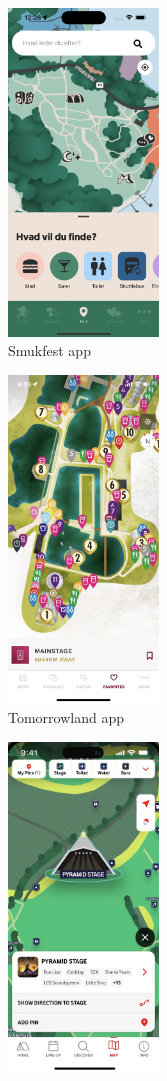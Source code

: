 \begin{figure}[H]
  \centering
  \begin{subfigure}{.3\textwidth}
    \centering
    \includegraphics[width=4cm]{Pictures/Misc/smukfest_app.png}
    \caption{Smukfest app \cite{smukfest_app}}
    \label{fig:smukfest_app}
  \end{subfigure}%
  \begin{subfigure}{.3\textwidth}
    \centering
    \includegraphics[width=4cm]{Pictures/Misc/tomorrowland_app.png}
    \caption{Tomorrowland app \cite{tomorrowland_app}}
    \label{fig:tomorrowland_app}
  \end{subfigure}
  \begin{subfigure}{.3\textwidth}
    \centering
    \includegraphics[width=4cm]{Pictures/Misc/glastonbury_app.png}

\end{subfigure}
\end{figure}
